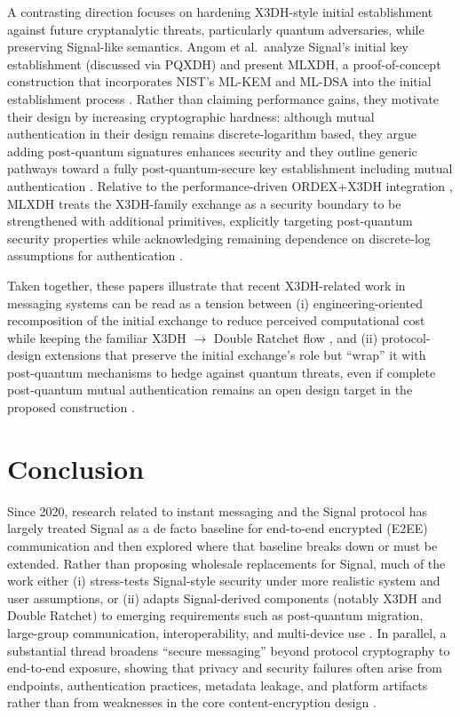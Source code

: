A contrasting direction focuses on hardening X3DH-style initial establishment against future cryptanalytic threats, particularly quantum adversaries, while preserving Signal-like semantics. Angom et al.\ analyze Signal’s initial key establishment (discussed via PQXDH) and present MLXDH, a proof-of-concept construction that incorporates NIST’s ML-KEM and ML-DSA into the initial establishment process \cite{angom2025}. Rather than claiming performance gains, they motivate their design by increasing cryptographic hardness: although mutual authentication in their design remains discrete-logarithm based, they argue adding post-quantum signatures enhances security and they outline generic pathways toward a fully post-quantum-secure key establishment including mutual authentication \cite{angom2025}. Relative to the performance-driven ORDEX+X3DH integration \cite{m2024}, MLXDH treats the X3DH-family exchange as a security boundary to be strengthened with additional primitives, explicitly targeting post-quantum security properties while acknowledging remaining dependence on discrete-log assumptions for authentication \cite{angom2025}.

Taken together, these papers illustrate that recent X3DH-related work in messaging systems can be read as a tension between (i) engineering-oriented recomposition of the initial exchange to reduce perceived computational cost while keeping the familiar X3DH $\rightarrow$ Double Ratchet flow \cite{m2024}, and (ii) protocol-design extensions that preserve the initial exchange’s role but “wrap” it with post-quantum mechanisms to hedge against quantum threats, even if complete post-quantum mutual authentication remains an open design target in the proposed construction \cite{angom2025}.

\section{Conclusion}

Since 2020, research related to instant messaging and the Signal protocol has largely treated Signal as a de facto baseline for end-to-end encrypted (E2EE) communication and then explored where that baseline breaks down or must be extended. Rather than proposing wholesale replacements for Signal, much of the work either (i) stress-tests Signal-style security under more realistic system and user assumptions, or (ii) adapts Signal-derived components (notably X3DH and Double Ratchet) to emerging requirements such as post-quantum migration, large-group communication, interoperability, and multi-device use \cite{oppliger2020,oppliger2024,basem2023,angom2025,bobrysheva2021,ayed2025}. In parallel, a substantial thread broadens “secure messaging” beyond protocol cryptography to end-to-end exposure, showing that privacy and security failures often arise from endpoints, authentication practices, metadata leakage, and platform artifacts rather than from weaknesses in the core content-encryption design \cite{jain2021,krishnapriya2021,bozorgi2023,brigham2025}.


